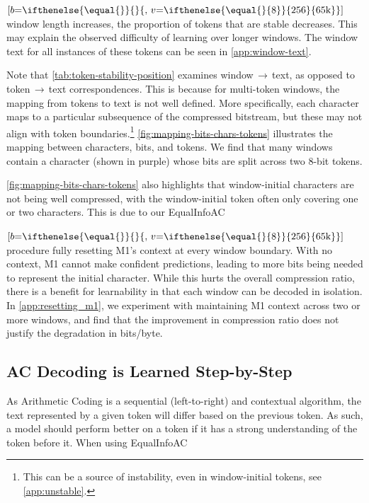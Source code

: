   {$[b\mathord{=}\ifthenelse{\equal{}}{}{,\,v\mathord{=}\ifthenelse{\equal{}{8}}{256}{65\text{k}}}]$} window length increases, the proportion of tokens that are stable decreases. This may explain the observed difficulty of learning over longer windows. The window text for all instances of these tokens can be seen in \ref{app:window-text}.

Note that \ref{tab:token-stability-position} examines window\,$\rightarrow$\,text, as opposed to token\,$\rightarrow$\,text correspondences. This is because for multi-token windows, the mapping from tokens to text is not well defined. More specifically, each character maps to a particular subsequence of the compressed bitstream, but these may not align with token boundaries.\footnote{This can be a source of instability, even in window-initial tokens, see \ref{app:unstable}.} \ref{fig:mapping-bits-chars-tokens} illustrates the mapping between characters, bits, and tokens. We find that many windows contain a character (shown in purple) whose bits are split across two $8$-bit tokens.

\ref{fig:mapping-bits-chars-tokens} also highlights that window-initial characters are not being well compressed, with the window-initial token often only covering one or two characters. This is due to our EqualInfoAC
\ifthenelse{
    \equal{} \AND \equal{}
  }

  {$[b\mathord{=}\ifthenelse{\equal{}}{}{,\,v\mathord{=}\ifthenelse{\equal{}{8}}{256}{65\text{k}}}]$} procedure fully resetting M1's context at every window boundary. With no context, M1 cannot make confident predictions, leading to more bits being needed to represent the initial character. While this hurts the overall compression ratio, there is a benefit for learnability in that each window can be decoded in isolation. In \ref{app:resetting_m1}, we experiment with maintaining M1 context across two or more windows, and find that the improvement in compression ratio does not justify the degradation in bits/byte.

\subsection{AC Decoding is Learned Step-by-Step}

As Arithmetic Coding is a sequential (left-to-right) and contextual algorithm, the text represented by a given token will differ based on the previous token. As such, a model should perform better on a token if it has a strong understanding of the token before it. When using EqualInfoAC
\ifthenelse{
    \equal{} \AND \equal{}
  }

